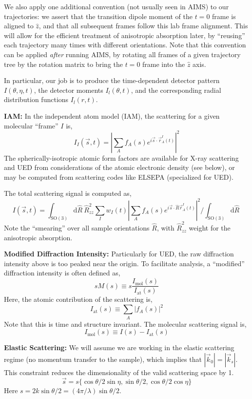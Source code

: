 \documentclass[fleqn,oneside,12pt]{article}
\begin{document}
We also apply one additional convention (not usually seen in AIMS) to our
trajectories: we assert that the transition dipole moment of the $t=0$ frame is
aligned to $\hat z$, and that all subsequent frames follow this lab frame
alignment. This will allow for the efficient treatment of anisotropic absorption
later, by ``reusing'' each trajectory many times with different orientations.
Note that this convention can be applied \emph{after} running AIMS, by rotating
all frames of a given trajectory tree by the rotation matrix to bring the $t=0$
frame into the $\hat z$ axis.

In particular, our job is to produce the time-dependent detector pattern $I
(\theta, \eta, t)$, the detector moments $I_{l} (\theta, t)$, and the
corresponding radial distribution functions $I_{l} (r, t)$.

\textbf{IAM:} In the independent atom model (IAM), the scattering for a given
molecular ``frame'' $I$ is,
\[
I_{I} (\vec s, t)
=   
\left |
\sum_{A}
f_{A} (s)
e^{i \vec s \cdot \vec r_{A}^{I} (t)}
\right |^2
\]
The spherically-isotropic atomic form factors are available for X-ray scattering
and UED from considerations of the atomic electronic density (see below), or may
be computed from scattering codes like ELSEPA (specialized for UED).

The total scattering signal is computed as,
\[
I (\vec s, t)
=
\int_{\mathrm{SO(3)}}
\mathrm{d} \hat R \
\hat R_{zz}^2
\sum_{I}
w_{I} (t)
\left |
\sum_{A}
f_{A} (s)
e^{i \vec s \cdot \hat R \vec r_{A}^{I} (t)}
\right |^2
/ 
\int_{\mathrm{SO(3)}}
\mathrm{d} \hat R \
\]
Note the ``smearing'' over all sample orientations $\hat R$, with $\hat
R_{zz}^2$ weight for the anisotropic absorption.

\textbf{Modified Diffraction Intensity:} Particularly for UED, the raw
diffraction intensity above is too peaked near the origin. To facilitate
analysis, a ``modified'' diffraction intensity is often defined as,
\[
s M(s)
\equiv
s
\frac{I_{\mathrm{mol}} (s)}{I_{\mathrm{at}} (s)}
\]
Here, the atomic contribution of the scattering is,
\[
I_{\mathrm{at}} (s)
\equiv
\sum_{A} | f_{A} (s) |^2
\]
Note that this is time and structure invariant. The molecular scattering signal
is,
\[
I_{\mathrm{mol}} (s)
\equiv
I (s)
-
I_{\mathrm{at}} (s)
\]

\textbf{Elastic Scattering:} We will assume we are working in the elastic
scattering regime (no momentum transfer to the sample), which implies that
$|\vec k_0| = |\vec k_s|$. This constraint reduces the dimensionality of the
valid scattering space by 1.
\[
\vec s = 
s 
\{
\cos \theta / 2 \sin \eta,
\sin \theta / 2,
\cos \theta / 2 \cos \eta
\}
\]
Here $s = 2 k \sin \theta / 2 = (4 \pi / \lambda) \sin \theta / 2$.
\end{document}
